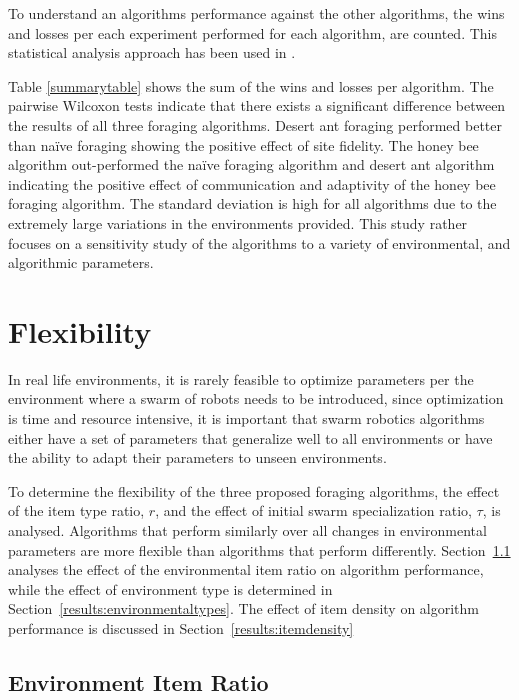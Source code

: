 To understand an algorithms performance against the other algorithms, the wins and losses per each experiment performed for each algorithm, are counted. This statistical analysis approach has been used in \cite{helbig2013performance}. 

Table \ref{summarytable} shows the sum of the wins and losses per algorithm. The pairwise Wilcoxon tests indicate that there exists a significant difference between the results of all three foraging algorithms. Desert ant foraging performed better than na\"ive foraging showing the positive effect of site fidelity. The honey bee algorithm out-performed the na\"ive foraging algorithm and desert ant algorithm indicating the positive effect of communication and adaptivity of the honey bee foraging algorithm. The standard deviation is high for all algorithms due to the extremely large variations in the environments provided. This study rather focuses on a sensitivity study of the algorithms to a variety of environmental, and algorithmic parameters.


\section{Flexibility}
\label{results:flexibility}

In real life environments, it is rarely feasible to optimize parameters per the environment where a swarm of robots needs to be introduced, since optimization is time and resource intensive, it is important that swarm robotics algorithms either have a set of parameters that generalize well to all environments or have the ability to adapt their parameters to unseen environments.

To determine the flexibility of the three proposed foraging algorithms, the effect of the item type ratio, $r$, and the effect of initial swarm specialization ratio, $\tau$, is analysed. Algorithms that perform similarly over all changes in environmental parameters are more flexible than algorithms that perform differently. Section~\ref{results:ratio} analyses the effect of the environmental item ratio on algorithm performance, while the effect of environment type is determined in Section~\ref{results:environmentaltypes}. The effect of item density on algorithm performance is discussed in Section~\ref{results:itemdensity}

\subsection{Environment Item Ratio}
\label{results:ratio}

